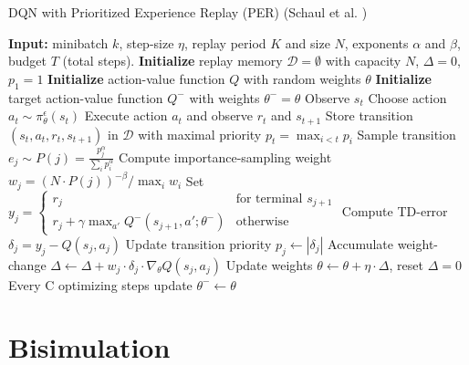 \begin{algorithm}
\caption{DQN with Prioritized Experience Replay (PER) (Schaul et al. \cite{schaul2015prioritized})}
\begin{algorithmic}[1]
\State \textbf{Input:} minibatch $k$, step-size $\eta$, replay period $K$ and size $N$, exponents $\alpha$ and $\beta$, budget $T$ (total steps).
\State \textbf{Initialize} replay memory $\mathcal{D} = \emptyset$ with capacity $N$, $\Delta = 0$, $p_1 = 1$
\State \textbf{Initialize} action-value function $Q$ with random weights $\theta$
\State \textbf{Initialize} target action-value function $Q^-$ with weights $\theta^- = \theta$
    \State Observe $s_t$
    \State Choose action $a_t \sim \pi^\epsilon_\theta(s_t)$
    \State Execute action $a_t$ and observe $r_t$ and $s_{t+1}$
    \State Store transition $(s_t, a_t, r_t, s_{t+1})$ in $\mathcal{D}$ with maximal priority $p_t = \max_{i < t} p_i$
            \State Sample transition $e_j \sim P(j) = \frac{p_j^\alpha}{\sum_i p_i^\alpha}$
            \State Compute importance-sampling weight $w_j = \left( N \cdot P(j) \right)^{-\beta} / \max_i w_i$
            \State Set $y_j = 
            \begin{cases} 
                r_j & \text{for terminal } s_{j+1}\\
                r_j + \gamma \max_{a'} Q^-(s_{j+1}, a'; \theta^-) & \text{otherwise}
            \end{cases}$
            \State Compute TD-error $\delta_j = y_j - Q(s_{j}, a_{j})$
            \State Update transition priority $p_j \leftarrow |\delta_j|$
            \State Accumulate weight-change $\Delta \leftarrow \Delta + w_j \cdot \delta_j \cdot \nabla_\theta Q(s_{j}, a_{j})$
        \EndFor
        \State Update weights $\theta \leftarrow \theta + \eta \cdot \Delta$, reset $\Delta = 0$
        \State Every C optimizing steps update $\theta^- \leftarrow \theta$
    \EndIf
\EndFor
\end{algorithmic}
\end{algorithm}






\section{Bisimulation}


